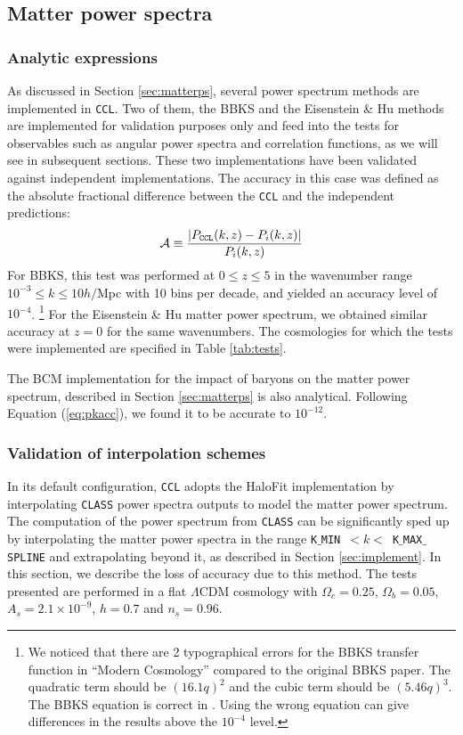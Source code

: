 \documentclass[\docopts]{\docclass}
\newcommand{\ccl}{{\tt CCL}\xspace}
\begin{document}
\subsection{Matter power spectra}

\subsubsection{Analytic expressions}

As discussed in Section \ref{sec:matterps}, several power spectrum methods are implemented in \ccl. Two of them, the BBKS \citep{BBKS} and the Eisenstein \& Hu methods are implemented for validation purposes only and feed into the tests for observables such as angular power spectra and correlation functions, as we will see in subsequent sections. These two implementations have been validated against independent implementations. The accuracy in this case was defined as the absolute fractional difference between the \ccl and the independent predictions:
\begin{equation}
  \mathcal{A}\equiv \frac{|P_{\tt CCL}(k,z)-P_{i}(k,z)|}{P_i(k,z)}
  \label{eq:pkacc}
\end{equation}
For BBKS, this test was performed at $0\leq z \leq 5$ in the wavenumber range $10^{-3} \leq k \leq 10 h/$Mpc with 10 bins per decade, and yielded an accuracy level of $10^{-4}$.
\footnote{We noticed that there are 2 typographical errors for the BBKS transfer function in ``Modern Cosmology'' \citep{DodelsonBook} compared to the original BBKS paper. The quadratic term should be $(16.1q)^2$ and the cubic term should be $(5.46q)^3$. The BBKS equation is correct in \citet{PeacockBook}. Using the wrong equation can give differences in the results above the $10^{-4}$ level.}
For the Eisenstein \& Hu matter power spectrum, we obtained similar accuracy at $z=0$ for the same wavenumbers. The cosmologies for which the tests were implemented are specified in Table \ref{tab:tests}.

The BCM implementation for the impact of baryons on the matter power spectrum, described in Section \ref{sec:matterps} is also analytical. Following Equation (\ref{eq:pkacc}), we found it to be accurate to $10^{-12}$.

\subsubsection{Validation of interpolation schemes}

In its default configuration, \ccl adopts the HaloFit \citep{CLASS_halofit} implementation by interpolating {\tt CLASS} power spectra outputs to model the matter power spectrum. The computation of the power spectrum from {\tt CLASS} can be significantly sped up by interpolating the matter power spectra in the range {\tt K$\_$MIN}~$<k<$~{\tt K$\_$MAX$\_$SPLINE} and extrapolating beyond it, as described in Section \ref{sec:implement}. In this section, we describe the loss of accuracy due to this method. The tests presented are performed in a flat $\Lambda$CDM cosmology with $\Omega_c=0.25$, $\Omega_b=0.05$, $A_s=2.1\times10^{-9}$, $h=0.7$ and $n_s=0.96$.
\end{document}
